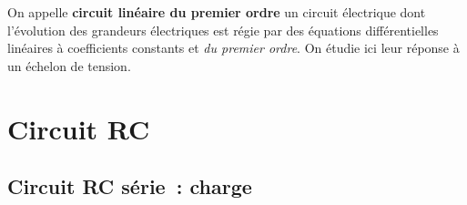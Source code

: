 \documentclass[../../main/main.tex]{subfiles}
\begin{document}
\vspace*{\fill}

On appelle \textbf{circuit linéaire du premier ordre} un circuit électrique
dont l'évolution des grandeurs électriques est régie par des équations
différentielles linéaires à coefficients constants et \textit{du premier
	ordre}. On étudie ici leur réponse à un échelon de tension.

\vspace*{\fill}

\newpage

\section{Circuit RC}
\subsection{Circuit RC série~: charge}
\end{document}
